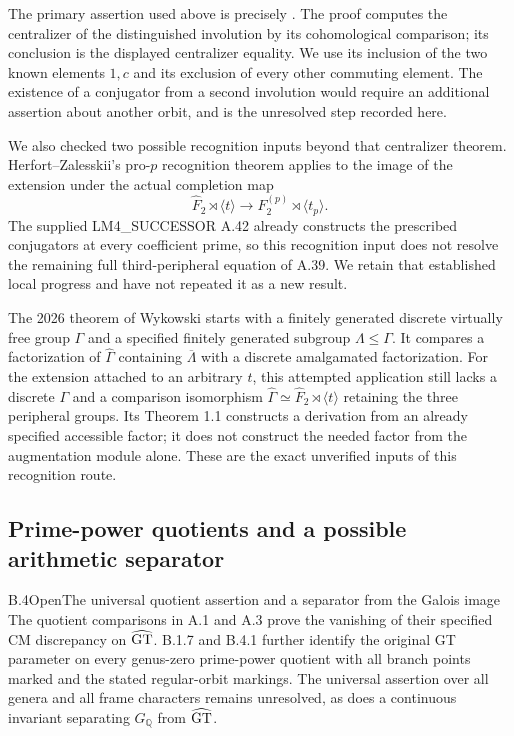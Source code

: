 The primary assertion used above is precisely
\cite[Proposition 4(ii), proof on printed p.~581]{CA_LS1997}.
The proof computes the centralizer of the distinguished
involution by its cohomological comparison; its conclusion
is the displayed centralizer equality. We use its
inclusion of the two known elements $1,c$ and its
exclusion of every other commuting element. The
existence of a conjugator from a second involution
would require an additional assertion about another
orbit, and is the unresolved step recorded here.

We also checked two possible recognition inputs beyond that
centralizer theorem. Herfort--Zalesskii's pro-$p$ recognition
theorem \cite[Theorems 6.2--6.3]{HerfortZalesskii2013}
applies to the image of the extension under the actual
completion map
\[
 \widehat F_2\rtimes\langle t\rangle
       \longrightarrow F_2^{(p)}\rtimes\langle t_p\rangle.
\]
The supplied LM4\_SUCCESSOR A.42 already constructs the
prescribed conjugators at every coefficient prime, so this
recognition input does not resolve the remaining full
third-peripheral equation of A.39. We retain that established
local progress and have not repeated it as a new result.

The 2026 theorem of Wykowski
\cite[Theorem 1.2]{Wykowski2026} starts with a finitely
generated discrete virtually free group $\Gamma$ and a
specified finitely generated subgroup $\Lambda\leq\Gamma$.
It compares a factorization of $\widehat\Gamma$ containing
$\overline\Lambda$ with a discrete amalgamated factorization.
For the extension attached to an arbitrary $t$, this attempted
application still lacks a discrete $\Gamma$ and a comparison
isomorphism
$\widehat\Gamma\simeq\widehat F_2\rtimes\langle t\rangle$
retaining the three peripheral groups. Its Theorem 1.1
constructs a derivation from an already specified accessible
factor; it does not construct the needed factor from the
augmentation module alone. These are the exact unverified
inputs of this recognition route.

\subsection{Prime-power quotients and a possible arithmetic separator}

\begin{result}{B.4}{Open}{The universal quotient assertion and a separator from the Galois image}
The quotient comparisons in A.1 and A.3 prove the vanishing
of their specified CM discrepancy on $\widehat{\mathrm{GT}}$.
B.1.7 and B.4.1 further identify the original GT parameter
on every genus-zero prime-power quotient with all branch
points marked and the stated regular-orbit markings.
The universal assertion over all genera and all frame
characters remains unresolved, as does a continuous
invariant separating $G_{\mathbb Q}$ from $\widehat{\mathrm{GT}}$.
\end{result}

